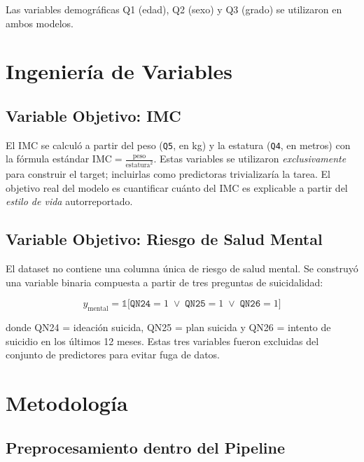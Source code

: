 \documentclass[conference]{IEEEtran}
\begin{document}
Las variables demográficas Q1 (edad), Q2 (sexo) y Q3 (grado) se utilizaron en ambos modelos.

\section{Ingeniería de Variables}

\subsection{Variable Objetivo: IMC}

El IMC se calculó a partir del peso (\texttt{Q5}, en kg) y la estatura (\texttt{Q4}, en metros) con la fórmula estándar $\text{IMC} = \frac{\text{peso}}{\text{estatura}^2}$. Estas variables se utilizaron \textit{exclusivamente} para construir el target; incluirlas como predictoras trivializaría la tarea. El objetivo real del modelo es cuantificar cuánto del IMC es explicable a partir del \textit{estilo de vida} autorreportado.

\subsection{Variable Objetivo: Riesgo de Salud Mental}

El dataset no contiene una columna única de riesgo de salud mental. Se construyó una variable binaria compuesta a partir de tres preguntas de suicidalidad:

\begin{equation}
  y_{\text{mental}} = \mathbb{1}\bigl[\texttt{QN24} = 1 \;\lor\; \texttt{QN25} = 1 \;\lor\; \texttt{QN26} = 1\bigr]
\end{equation}

donde QN24 = ideación suicida, QN25 = plan suicida y QN26 = intento de suicidio en los últimos 12 meses. Estas tres variables fueron excluidas del conjunto de predictores para evitar fuga de datos.

\section{Metodología}

\subsection{Preprocesamiento dentro del Pipeline}
\end{document}
